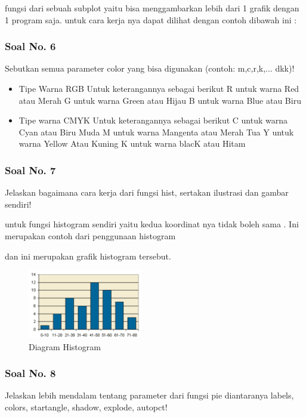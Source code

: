 \hfill \break
fungsi dari sebuah subplot yaitu bisa menggambarkan lebih dari 1 grafik dengan 1 program saja.
untuk cara kerja nya dapat dilihat dengan contoh dibawah ini :


\subsubsection{Soal No. 6}
\hfill \break
Sebutkan semua parameter color yang bisa digunakan (contoh:  m,c,r,k,...  dkk)!

\begin{itemize}
    \item Tipe Warna RGB
    Untuk keterangannya sebagai berikut
    R untuk warna Red atau Merah
    G untuk warna Green atau Hijau
    B untuk warna Blue atau Biru
    \item Tipe warna CMYK
    Untuk keterangannya sebagai berikut
    C untuk warna Cyan atau Biru Muda
    M untuk warna Mangenta atau Merah Tua
    Y untuk warna Yellow Atau Kuning
    K untuk warna blacK atau Hitam
\end{itemize}

\subsubsection{Soal No. 7}
\hfill \break
Jelaskan bagaimana cara kerja dari fungsi hist, sertakan ilustrasi dan gambar sendiri!

\hfill \break
untuk fungsi histogram sendiri yaitu kedua koordinat nya tidak boleh sama .
Ini merupakan contoh dari penggunaan histogram

dan ini merupakan grafik histogram tersebut.
\begin{figure}[H]	
    \includegraphics[width=5cm]{figures/6/1174003/histogram.png}
    \centering
    \caption{Diagram Histogram}
\end{figure}

\subsubsection{Soal No. 8}
\hfill \break
 Jelaskan lebih mendalam tentang parameter dari fungsi pie diantaranya labels, colors, startangle, shadow, explode, autopct!
 
